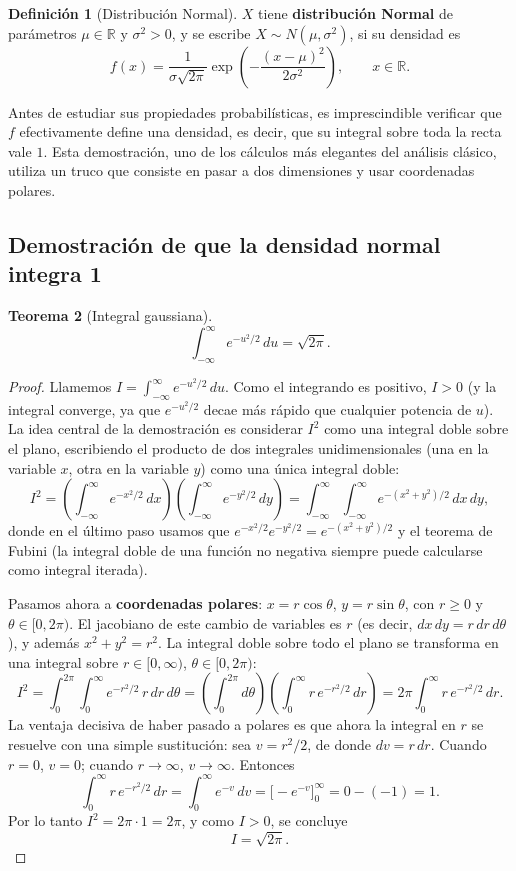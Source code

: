 \documentclass[11pt,a4paper]{article}
\theoremstyle{plain}
\newtheorem{teorema}{Teorema}[section]
\theoremstyle{definition}
\newtheorem{definicion}[teorema]{Definición}
\theoremstyle{remark}
\begin{document}
\begin{definicion}[Distribución Normal]
$X$ tiene \textbf{distribución Normal} de parámetros $\mu\in\mathbb{R}$ y $\sigma^2>0$, y se escribe $X\sim N(\mu,\sigma^2)$, si su densidad es
$$f(x)=\frac{1}{\sigma\sqrt{2\pi}}\exp\left(-\frac{(x-\mu)^2}{2\sigma^2}\right),\qquad x\in\mathbb{R}.$$
\end{definicion}

Antes de estudiar sus propiedades probabilísticas, es imprescindible verificar que $f$ efectivamente define una densidad, es decir, que su integral sobre toda la recta vale $1$. Esta demostración, uno de los cálculos más elegantes del análisis clásico, utiliza un truco que consiste en pasar a dos dimensiones y usar coordenadas polares.

\subsection{Demostración de que la densidad normal integra 1}

\begin{teorema}[Integral gaussiana]\label{thm:integral_gaussiana}
$$\int_{-\infty}^{\infty}e^{-u^2/2}\,du=\sqrt{2\pi}.$$
\end{teorema}

\begin{proof}
Llamemos $I=\displaystyle\int_{-\infty}^{\infty}e^{-u^2/2}\,du$. Como el integrando es positivo, $I>0$ (y la integral converge, ya que $e^{-u^2/2}$ decae más rápido que cualquier potencia de $u$). La idea central de la demostración es considerar $I^2$ como una integral doble sobre el plano, escribiendo el producto de dos integrales unidimensionales (una en la variable $x$, otra en la variable $y$) como una única integral doble:
$$I^2=\left(\int_{-\infty}^{\infty}e^{-x^2/2}\,dx\right)\left(\int_{-\infty}^{\infty}e^{-y^2/2}\,dy\right)=\int_{-\infty}^{\infty}\int_{-\infty}^{\infty}e^{-(x^2+y^2)/2}\,dx\,dy,$$
donde en el último paso usamos que $e^{-x^2/2}e^{-y^2/2}=e^{-(x^2+y^2)/2}$ y el teorema de Fubini (la integral doble de una función no negativa siempre puede calcularse como integral iterada).

Pasamos ahora a \textbf{coordenadas polares}: $x=r\cos\theta$, $y=r\sin\theta$, con $r\ge0$ y $\theta\in[0,2\pi)$. El jacobiano de este cambio de variables es $r$ (es decir, $dx\,dy=r\,dr\,d\theta$), y además $x^2+y^2=r^2$. La integral doble sobre todo el plano se transforma en una integral sobre $r\in[0,\infty)$, $\theta\in[0,2\pi)$:
$$I^2=\int_0^{2\pi}\int_0^\infty e^{-r^2/2}\,r\,dr\,d\theta=\left(\int_0^{2\pi}d\theta\right)\left(\int_0^\infty r\,e^{-r^2/2}\,dr\right)=2\pi\int_0^\infty r\,e^{-r^2/2}\,dr.$$
La ventaja decisiva de haber pasado a polares es que ahora la integral en $r$ se resuelve con una simple sustitución: sea $v=r^2/2$, de donde $dv=r\,dr$. Cuando $r=0$, $v=0$; cuando $r\to\infty$, $v\to\infty$. Entonces
$$\int_0^\infty r\,e^{-r^2/2}\,dr=\int_0^\infty e^{-v}\,dv=\big[-e^{-v}\big]_0^\infty=0-(-1)=1.$$
Por lo tanto $I^2=2\pi\cdot1=2\pi$, y como $I>0$, se concluye
$$I=\sqrt{2\pi}.$$
\end{proof}
\end{document}
